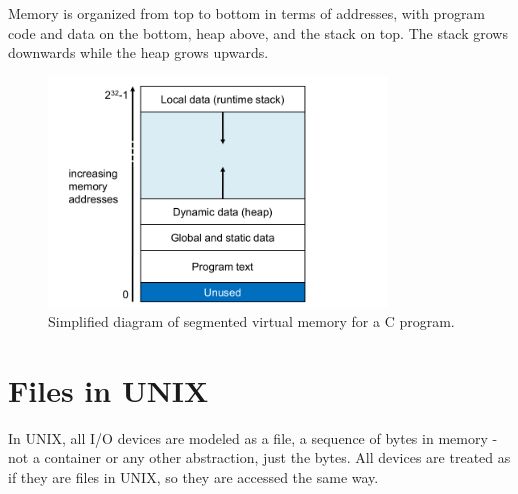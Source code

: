 \documentclass[11pt]{article}
\begin{document}
		Memory is organized from top to bottom in terms of addresses, with program code and data on the bottom, heap above, and the stack on top. The stack grows downwards while the heap grows upwards.
		
	\begin{figure}[htb]
		\centering
		\includegraphics[width=0.8\textwidth]{vmem.png}
		\caption{Simplified diagram of segmented virtual memory for a C program.}
		\label{fig:virtual memory}
	\end{figure}
	
\section{Files in UNIX}
	In UNIX, all I/O devices are modeled as a file, a sequence of bytes in memory - not a container or any other abstraction, just the bytes. All devices are treated as if they are files in UNIX, so they are accessed the same way.

%		
%		


\end{document}
